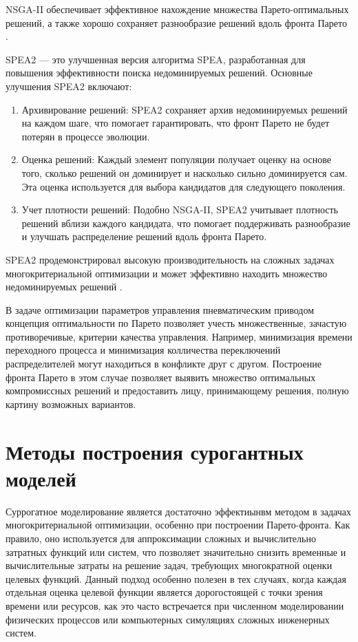 NSGA-II обеспечивает эффективное нахождение множества Парето-оптимальных решений,
а также хорошо сохраняет разнообразие решений вдоль фронта Парето \cite*{deb2001multi}.

SPEA2 — это улучшенная версия алгоритма SPEA, разработанная для повышения эффективности поиска недоминируемых решений. Основные улучшения SPEA2 включают:

\begin{enumerate}
    \item Архивирование решений: SPEA2 сохраняет архив недоминируемых решений на каждом шаге, что помогает гарантировать,
    что фронт Парето не будет потерян в процессе эволюции.

    \item Оценка решений: Каждый элемент популяции получает оценку на основе того,
    сколько решений он доминирует и насколько сильно доминируется сам. Эта оценка
    используется для выбора кандидатов для следующего поколения.

    \item Учет плотности решений: Подобно NSGA-II, SPEA2 учитывает плотность решений
    вблизи каждого кандидата, что помогает поддерживать разнообразие и улучшать
    распределение решений вдоль фронта Парето.
\end{enumerate}

SPEA2 продемонстрировал высокую производительность на сложных задачах многокритериальной
оптимизации и может эффективно находить множество недоминируемых решений \cite{zitzler2001spea2}.

В задаче оптимизации параметров управления пневматическим приводом концепция оптимальности
по Парето позволяет учесть множественные, зачастую противоречивые, критерии качества управления.
Например, минимизация времени переходного процесса и минимизация колличества переключений распределителей
могут находиться в конфликте друг с другом. Построение фронта Парето в этом случае
позволяет выявить множество оптимальных компромиссных решений и
предоставить лицу, принимающему решения, полную картину возможных вариантов.



\section{Методы построения сурогантных моделей}\label{sec:ch4/sec3}
Суррогатное моделирование является достаточно эффектиынвм методом в
задачах многокритериальной оптимизации, особенно при построении
Парето-фронта. Как правило, оно используется для аппроксимации сложных и вычислительно
затратных функций или систем, что позволяет значительно снизить временные и вычислительные
затраты на решение задач, требующих многократной оценки целевых функций. Данный
подход особенно полезен в тех случаях, когда каждая отдельная оценка целевой функции
является дорогостоящей с точки зрения времени или ресурсов, как это часто встречается
при численном моделировании физических процессов или компьютерных симуляциях сложных
инженерных систем.

